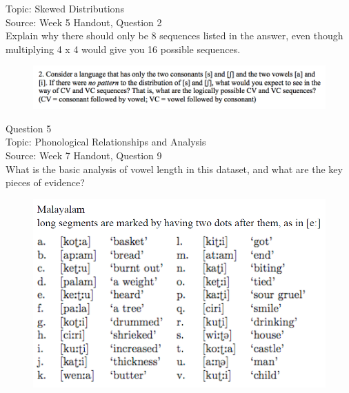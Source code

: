 \documentclass[12pt]{article}
\begin{document}
Topic: Skewed Distributions\\
Source: Week 5 Handout, Question 2\\

Explain why there should only be 8 sequences listed in the answer, even though multiplying 4 x 4 would give you 16 possible sequences.\\

\begin{figure}[H]
\includegraphics{../images/skew2.png}
\end{figure}

\newpage

{\large Question 5}\\

Topic: Phonological Relationships and Analysis\\
Source: Week 7 Handout, Question 9\\

What is the basic analysis of vowel length in this dataset, and what are the key pieces of evidence?\\

\begin{figure}[H]
\includegraphics{../images/malayalam.png}
\end{figure}

\newpage

\begin{center}
\textbf{{\color{red}{\HUGE END OF EXAM}}}\\

\end{center}
\newpage
\end{document}
